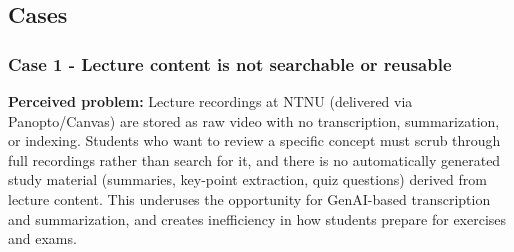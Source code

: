 \subsection{Cases}
\label{subsec: Cases}
\subsubsection{Case 1 - Lecture content is not searchable or reusable}
\textbf{Perceived problem:} Lecture recordings at NTNU (delivered via Panopto/Canvas) are stored as raw video with no transcription, summarization, or indexing. Students who want to review a specific concept must scrub through full recordings rather than search for it, and there is no automatically generated study material (summaries, key-point extraction, quiz questions) derived from lecture content. This underuses the opportunity for GenAI-based transcription and summarization, and creates inefficiency in how students prepare for exercises and exams.


